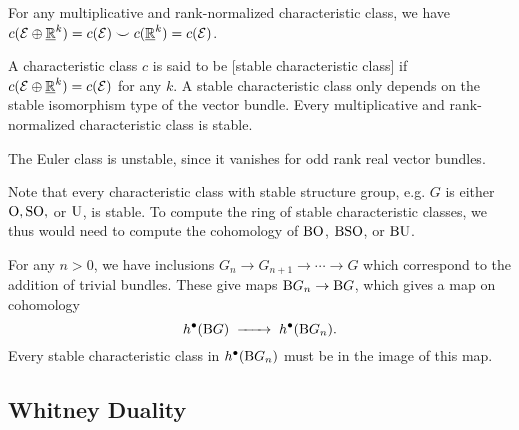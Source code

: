 \begin{corollary}
	For any multiplicative and rank-normalized characteristic class, we have $c(\mathcal{E}\oplus \underline{\mathbb{R}}^k)=c(\mathcal{E})\smile c(\underline{\mathbb{R}}^k)= c(\mathcal{E})$.
\end{corollary}

\begin{definition}
	A characteristic class $c$ is said to be [stable characteristic class] if $c(\mathcal{E}\oplus \underline{\mathbb{R}}^k) = c(\mathcal{E})$ for any $k$. A stable characteristic class only depends on the stable isomorphism type of the vector bundle. Every multiplicative and rank-normalized characteristic class is stable.
\end{definition}

\begin{example}
	The Euler class is unstable, since it vanishes for odd rank real vector bundles.
\end{example}

\begin{remark}
	Note that every characteristic class with stable structure group, e.g. $G$ is either $\mathrm{O}, \mathrm{SO},$ or $\mathrm{U}$, is stable. To compute the ring of stable characteristic classes, we thus would need to compute the cohomology of $\mathrm{BO}$, $\mathrm{BSO}$, or $\mathrm{BU}$.

	For any $n>0$, we have inclusions $G_n \to G_{n+1} \to \cdots \to G$ which correspond to the addition of trivial bundles. These give maps $\mathrm{B} G_n \to \mathrm{B} G$, which gives a map on cohomology
	\[
		h^\bullet(\BB G) \lkxto h^\bullet(\BB G_n).
	\]
	Every stable characteristic class in $h^\bullet(\mathrm{B} G_n)$ must be in the image of this map.
\end{remark}

\subsection{Whitney Duality}

